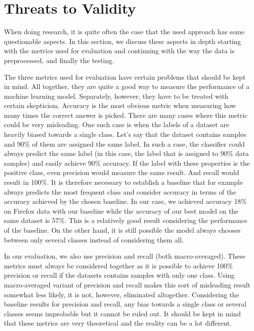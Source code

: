\section{Threats to Validity}

When doing research, it is quite often the case that the used approach has some questionable aspects. In this section, we discuss these aspects in depth starting with the metrics used for evaluation and continuing with the way the data is preprocessed, and finally the testing.

The three metrics used for evaluation have certain problems that should be kept in mind. All together, they are quite a good way to measure the performance of a machine learning model. Separately, however, they have to be treated with certain skepticism. Accuracy is the most obvious metric when measuring how many times the correct answer is picked. There are many cases where this metric could be very misleading. One such case is when the labels of a dataset are heavily biased towards a single class. Let's say that the dataset contains samples and 90\% of them are assigned the same label. In such a case, the classifier could always predict the same label (in this case, the label that is assigned to 90\% data samples) and easily achieve 90\% accuracy. If the label with these properties is the positive class, even precision would measure the same result. And recall would result in 100\%. It is therefore necessary to establish a baseline that for example always predicts the most frequent class and consider accuracy in terms of the accuracy achieved by the chosen baseline. In our case, we achieved accuracy 18\% on Firefox data with our baseline while the accuracy of our best model on the same dataset is 57\%. This is a relatively good result considering the performance of the baseline. On the other hand, it is still possible the model always chooses between only several classes instead of considering them all. 

In our evaluation, we also use precision and recall (both macro-averaged). These metrics must always be considered together as it is possible to achieve 100\% precision or recall if the datasets contains samples with only one class. Using macro-averaged variant of precision and recall makes this sort of misleading result somewhat less likely, it is not, however, eliminated altogether. Considering the baseline results for precision and recall, any bias towards a single class or several classes seems improbable but it cannot be ruled out. It should be kept in mind that these metrics are very theoretical and the reality can be a lot different.

